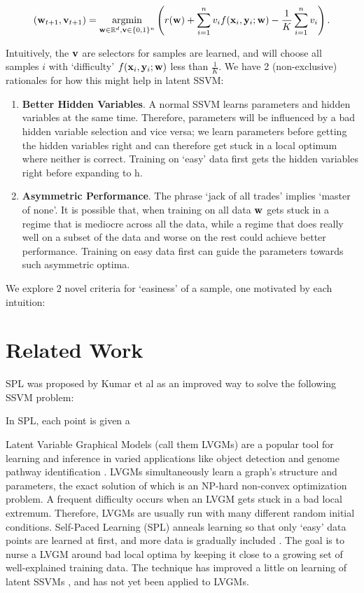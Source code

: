 \documentclass{article}
\newcommand{\argmin}{\operatornamewithlimits{argmin}}
\begin{document}
\begin{equation}
({\bf w}_{t+1}, {\bf v}_{t+1}) = \argmin_{{\bf w} \in \mathbb{R}^d,{\bf v} \in \{0,1\}^n}
\left(r({\bf w}) + \sum_{i=1}^n v_i f({\bf x}_i,{\bf y}_i; {\bf w}) -
\frac{1}{K}\sum_{i=1}^n v_i\right).
\label{eq:selfPacedMIP}
\end{equation}

Intuitively, the $\bf v$ are selectors for samples are learned, and will choose all samples $i$ with `difficulty' $f({\bf x}_i,{\bf y}_i; {\bf w})$ less than $\frac{1}{K}$. We have 2 (non-exclusive) rationales for how this might help in latent SSVM:

\begin{enumerate}
\item \textbf{Better Hidden Variables}.  A normal SSVM learns parameters and hidden variables at the same time.  Therefore, parameters will be influenced by a bad hidden variable selection and vice versa; we learn parameters before getting the hidden variables right and can therefore get stuck in a local optimum where neither is correct.  Training on `easy' data first gets the hidden variables right before expanding to h.
\item \textbf{Asymmetric Performance}.  The phrase `jack of all trades' implies `master of none'.  It is possible that, when training on all data $\bf w$ gets stuck in a regime that is mediocre across all the data, while a regime that does really well on a subset of the data and worse on the rest could achieve better performance.  Training on easy data first can guide the parameters towards such asymmetric optima.
\end{enumerate}

We explore 2 novel criteria for `easiness' of a sample, one motivated by each intuition:

\section{Related Work}
SPL was proposed by Kumar et al \cite{SPL} as an improved way to solve the following SSVM problem:




In SPL, each point is given a 

Latent Variable Graphical Models (call them LVGMs) are a popular tool for learning and inference in varied applications like object detection \cite{2} and genome pathway identification \cite{1}.  LVGMs simultaneously learn a graph's structure and parameters, the exact solution of which is an NP-hard non-convex optimization problem.  A frequent difficulty occurs when an LVGM gets stuck in a bad local extremum.  Therefore, LVGMs are usually run with many different random initial conditions.  Self-Paced Learning (SPL) anneals learning so that only `easy' data points are learned at first, and more data is gradually included \cite{SPL}.  The goal is to nurse a LVGM around bad local optima by keeping it close to a growing set of well-explained training data.  The technique has improved a little on learning of latent SSVMs \cite{SPL}, and has not yet been applied to LVGMs.
\end{document}
